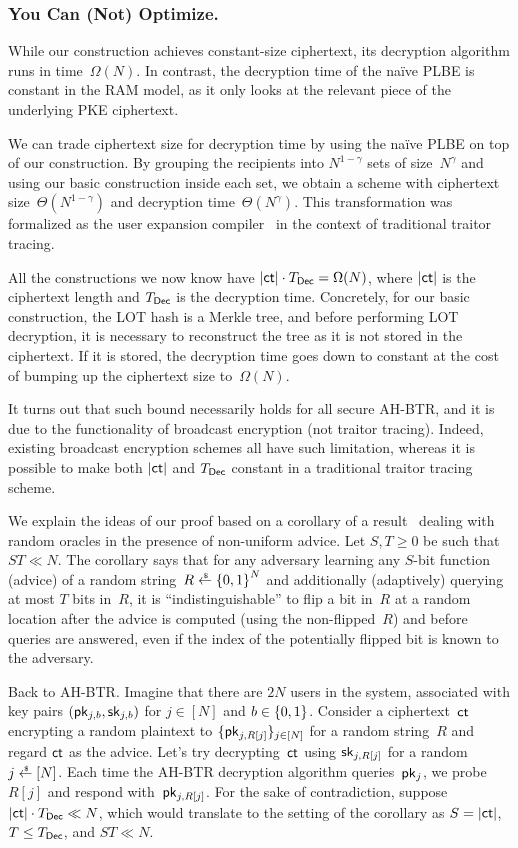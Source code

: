 \subsubsection{You Can (Not) Optimize.}
While our construction achieves constant-size ciphertext,
its decryption algorithm runs in time~$\Omega(N)$.
In contrast, the decryption time of the na{\"i}ve PLBE is constant in the RAM model, as it only looks at the relevant piece of the underlying PKE ciphertext.

We can trade ciphertext size for decryption time by using the na{\"i}ve PLBE on top of our construction.
By grouping the recipients into $N^{1-\gamma}$ sets of size~$N^\gamma$ and using our basic construction inside each set, we obtain a scheme with ciphertext size~$\Theta(N^{1-\gamma})$ and decryption time~$\Theta(N^\gamma)$.
This transformation was formalized as the user expansion compiler~\cite{C:Zhandry20} in the context of traditional traitor tracing.

All the constructions we now know have ${|\ct|\cdot\TDec=\Omega(N)}$,
where $|\ct|$ is the ciphertext length and $\TDec$ is the decryption time.
Concretely, for our basic construction, the LOT hash is a Merkle tree, and before performing LOT decryption, it is necessary to reconstruct the tree as it is not stored in the ciphertext.
If it is stored, the decryption time goes down to constant at the cost of bumping up the ciphertext size to~$\Omega(N)$.

It turns out that such bound necessarily holds for all secure AH-BTR, and
it is due to the functionality of broadcast encryption (not traitor tracing).
Indeed, existing broadcast encryption schemes all have such limitation, whereas
it is possible to make both $|\ct|$ and $\TDec$ constant in a traditional traitor tracing scheme.

We explain the ideas of our proof based on a corollary of a result~\cite{C:Unruh07} dealing with random oracles in the presence of non-uniform advice.
Let ${S,T\geq 0}$ be such that ${ST\ll N}$.
The corollary says that
for any adversary learning any $S$-bit function (advice) of a random string~${R\draws\bit^N}$ and additionally (adaptively) querying at most $T$ bits in~$R$,
it is ``indistinguishable'' to flip a bit in~$R$ at a random location
after the advice is computed (using the non-flipped~$R$) and
before queries are answered,
even if the index of the potentially flipped bit is known to the adversary.

Back to AH-BTR. Imagine that there are $2N$ users in the system, associated with key pairs $(\pk_{j,b},\sk_{j,b})$ for ${j\in[N]}$ and ${b\in{\{0,1\}}}$.
Consider a ciphertext~$\ct$ encrypting a random plaintext to $\{\pk_{j,R[j]}\}_{j\in[N]}$ for a random string~$R$ and
regard $\ct$ as the advice.
Let's try decrypting~$\ct$ using $\sk_{j,R[j]}$ for a random ${j\draws[N]}$.
Each time the AH-BTR decryption algorithm queries~$\pk_j$,
we probe $R[j]$ and respond with~$\pk_{j,R[j]}$.
For the sake of contradiction, suppose ${|\ct|\cdot\TDec\ll N}$,
which would translate to the setting of the corollary as ${S=|\ct|}$, ${T\leq\TDec}$, and ${ST\ll N}$.

